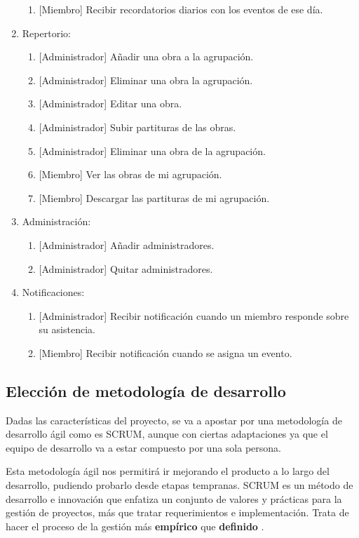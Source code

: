\begin{enumerate}
    \begin{enumerate}
        \item {[Miembro]} Recibir recordatorios diarios con los eventos de ese día.
    \end{enumerate}
    \item Repertorio:
    \begin{enumerate}
        \item {[Administrador]} Añadir una obra a la agrupación.
        \item {[Administrador]} Eliminar una obra la agrupación.
        \item {[Administrador]} Editar una obra.
        \item {[Administrador]} Subir partituras de las obras.
        \item {[Administrador]} Eliminar una obra de la agrupación.
        \item {[Miembro]} Ver las obras de mi agrupación.
        \item {[Miembro]} Descargar las partituras de mi agrupación.
    \end{enumerate}
    \item Administración:
    \begin{enumerate}
        \item {[Administrador]} Añadir administradores.
        \item {[Administrador]} Quitar administradores.
    \end{enumerate}
    \item Notificaciones:
    \begin{enumerate}
        \item {[Administrador]} Recibir notificación cuando un miembro responde sobre su asistencia.
        \item {[Miembro]} Recibir notificación cuando se asigna un evento.
    \end{enumerate}
\end{enumerate}


\subsection{Elección de metodología de desarrollo}

Dadas las características del proyecto, se va a apostar por una metodología de desarrollo ágil como es SCRUM, aunque con ciertas adaptaciones ya que el equipo de desarrollo va a estar compuesto por una sola persona.

Esta metodología ágil nos permitirá ir mejorando el producto a lo largo del desarrollo, pudiendo probarlo desde etapas tempranas. SCRUM es un método de desarrollo e innovación que enfatiza un conjunto de valores y prácticas para la gestión de proyectos, más que tratar requerimientos e implementación. Trata de hacer el proceso de la gestión más \textbf{empírico} que \textbf{definido} \cite{scrum}.

